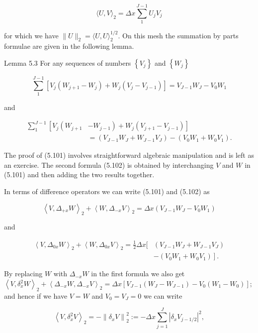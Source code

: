 \documentclass[10pt]{article}
\begin{document}
\[
\langle U, V\rangle_{2}=\Delta x \sum_{1}^{J-1} U_{j} V_{j}
\]

for which we have \(\|U\|_{2}=\langle U, U\rangle_{2}^{1 / 2}\). On this mesh the summation by parts formulae are given in the following lemma.

Lemma 5.3 For any sequences of numbers \(\left\{V_{j}\right\}\) and \(\left\{W_{j}\right\}\)

\[
\sum_{1}^{J-1}\left[V_{j}\left(W_{j+1}-W_{j}\right)+W_{j}\left(V_{j}-V_{j-1}\right)\right]=V_{J-1} W_{J}-V_{0} W_{1}
\]

and

\[
\begin{aligned}
\sum_{1}^{J-1}\left[V _ { j } \left(W_{j+1}\right.\right. & \left.\left.-W_{j-1}\right)+W_{j}\left(V_{j+1}-V_{j-1}\right)\right] \\
& =\left(V_{J-1} W_{J}+W_{J-1} V_{J}\right)-\left(V_{0} W_{1}+W_{0} V_{1}\right) .
\end{aligned}
\]

The proof of (5.101) involves straightforward algebraic manipulation and is left as an exercise. The second formula (5.102) is obtained by interchanging \(V\) and \(W\) in (5.101) and then adding the two results together.

In terms of difference operators we can write (5.101) and (5.102) as

\[
\left\langle V, \Delta_{+x} W\right\rangle_{2}+\left\langle W, \Delta_{-x} V\right\rangle_{2}=\Delta x\left(V_{J-1} W_{J}-V_{0} W_{1}\right)
\]

and

\[
\begin{aligned}
\left\langle V, \Delta_{0 x} W\right\rangle_{2}+\left\langle W, \Delta_{0 x} V\right\rangle_{2}=\frac{1}{2} \Delta x[ & \left(V_{J-1} W_{J}+W_{J-1} V_{J}\right) \\
& \left.-\left(V_{0} W_{1}+W_{0} V_{1}\right)\right] .
\end{aligned}
\]

By replacing \(W\) with \(\Delta_{-x} W\) in the first formula we also get\\
\(\left\langle V, \delta_{x}^{2} W\right\rangle_{2}+\left\langle\Delta_{-x} W, \Delta_{-x} V\right\rangle_{2}=\Delta x\left[V_{J-1}\left(W_{J}-W_{J-1}\right)-V_{0}\left(W_{1}-W_{0}\right)\right] ;\)\\
and hence if we have \(V=W\) and \(V_{0}=V_{J}=0\) we can write

\[
\left\langle V, \delta_{x}^{2} V\right\rangle_{2}=-\left\|\delta_{x} V\right\|_{2}^{2}:=-\Delta x \sum_{j=1}^{J}\left|\delta_{x} V_{j-1 / 2}\right|^{2},
\]
\end{document}
